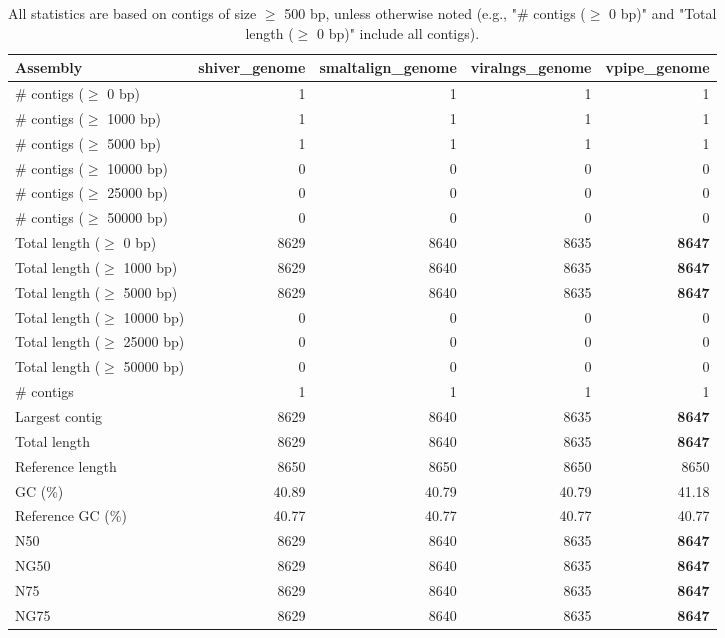 \documentclass[12pt,a4paper]{article}
\begin{document}
\begin{table}[ht]
\begin{center}
\caption{All statistics are based on contigs of size $\geq$ 500 bp, unless otherwise noted (e.g., "\# contigs ($\geq$ 0 bp)" and "Total length ($\geq$ 0 bp)" include all contigs).}
\begin{tabular}{|l*{4}{|r}|}
\hline
Assembly & shiver\_genome & smaltalign\_genome & viralngs\_genome & vpipe\_genome \\ \hline
\# contigs ($\geq$ 0 bp) & 1 & 1 & 1 & 1 \\ \hline
\# contigs ($\geq$ 1000 bp) & 1 & 1 & 1 & 1 \\ \hline
\# contigs ($\geq$ 5000 bp) & 1 & 1 & 1 & 1 \\ \hline
\# contigs ($\geq$ 10000 bp) & 0 & 0 & 0 & 0 \\ \hline
\# contigs ($\geq$ 25000 bp) & 0 & 0 & 0 & 0 \\ \hline
\# contigs ($\geq$ 50000 bp) & 0 & 0 & 0 & 0 \\ \hline
Total length ($\geq$ 0 bp) & 8629 & 8640 & 8635 & {\bf 8647} \\ \hline
Total length ($\geq$ 1000 bp) & 8629 & 8640 & 8635 & {\bf 8647} \\ \hline
Total length ($\geq$ 5000 bp) & 8629 & 8640 & 8635 & {\bf 8647} \\ \hline
Total length ($\geq$ 10000 bp) & 0 & 0 & 0 & 0 \\ \hline
Total length ($\geq$ 25000 bp) & 0 & 0 & 0 & 0 \\ \hline
Total length ($\geq$ 50000 bp) & 0 & 0 & 0 & 0 \\ \hline
\# contigs & 1 & 1 & 1 & 1 \\ \hline
Largest contig & 8629 & 8640 & 8635 & {\bf 8647} \\ \hline
Total length & 8629 & 8640 & 8635 & {\bf 8647} \\ \hline
Reference length & 8650 & 8650 & 8650 & 8650 \\ \hline
GC (\%) & 40.89 & 40.79 & 40.79 & 41.18 \\ \hline
Reference GC (\%) & 40.77 & 40.77 & 40.77 & 40.77 \\ \hline
N50 & 8629 & 8640 & 8635 & {\bf 8647} \\ \hline
NG50 & 8629 & 8640 & 8635 & {\bf 8647} \\ \hline
N75 & 8629 & 8640 & 8635 & {\bf 8647} \\ \hline
NG75 & 8629 & 8640 & 8635 & {\bf 8647} \\ \hline

\end{tabular}
\end{center}
\end{table}
\end{document}
